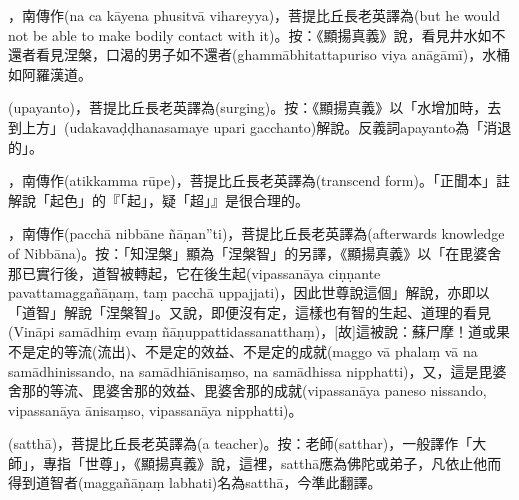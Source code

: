 \startitemgroup[noteitems]
\item{}，南傳作(na ca kāyena phusitvā vihareyya)，菩提比丘長老英譯為(but he would not be able to make bodily contact with it)。按：《顯揚真義》說，看見井水如不還者看見涅槃，口渴的男子如不還者(ghammābhitattapuriso viya anāgāmī)，水桶如阿羅漢道。
\stopitemgroup

\startitemgroup[noteitems]
\item{}(upayanto)，菩提比丘長老英譯為(surging)。按：《顯揚真義》以「水增加時，去到上方」(udakavaḍḍhanasamaye upari gacchanto)解說。反義詞apayanto為「消退的」。
\stopitemgroup

\startitemgroup[noteitems]
\item{}，南傳作(atikkamma rūpe)，菩提比丘長老英譯為(transcend form)。「正聞本」註解說「起色」的『「起」，疑「超」』是很合理的。
\stopitemgroup

\startitemgroup[noteitems]
\item{}，南傳作(pacchā nibbāne ñāṇan”ti)，菩提比丘長老英譯為(afterwards knowledge of Nibbāna)。按：「知涅槃」顯為「涅槃智」的另譯，《顯揚真義》以「在毘婆舍那已實行後，道智被轉起，它在後生起(vipassanāya ciṇṇante pavattamaggañāṇaṃ, taṃ pacchā uppajjati)，因此世尊說這個」解說，亦即以「道智」解說「涅槃智」。又說，即便沒有定，這樣也有智的生起、道理的看見(Vināpi samādhiṃ evaṃ ñāṇuppattidassanatthaṃ)，[故]這被說：蘇尸摩！道或果不是定的等流(流出)、不是定的效益、不是定的成就(maggo vā phalaṃ vā na samādhinissando, na samādhiānisaṃso, na samādhissa nipphatti)，又，這是毘婆舍那的等流、毘婆舍那的效益、毘婆舍那的成就(vipassanāya paneso nissando, vipassanāya ānisaṃso, vipassanāya nipphatti)。
\stopitemgroup

\startitemgroup[noteitems]
\item{}(satthā)，菩提比丘長老英譯為(a teacher)。按：老師(satthar)，一般譯作「大師」，專指「世尊」，《顯揚真義》說，這裡，satthā應為佛陀或弟子，凡依止他而得到道智者(maggañāṇaṃ labhati)名為satthā，今準此翻譯。
\stopitemgroup

